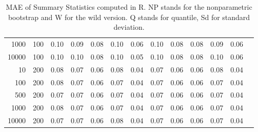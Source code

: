 \begin{table}[ht]
\begin{tabular}{rrrrrrrrrrrrr}
  1000 & 100 & 0.10 & 0.09 & 0.08 & 0.10 & 0.06 & 0.10 & 0.08 & 0.08 & 0.09 & 0.06 \\ 
  10000 & 100 & 0.10 & 0.10 & 0.08 & 0.10 & 0.05 & 0.10 & 0.08 & 0.08 & 0.10 & 0.06 \\ 
  10 & 200 & 0.08 & 0.07 & 0.06 & 0.08 & 0.04 & 0.07 & 0.06 & 0.06 & 0.08 & 0.04 \\ 
  100 & 200 & 0.08 & 0.07 & 0.06 & 0.07 & 0.04 & 0.07 & 0.06 & 0.06 & 0.07 & 0.04 \\ 
  500 & 200 & 0.07 & 0.07 & 0.06 & 0.07 & 0.04 & 0.07 & 0.06 & 0.06 & 0.07 & 0.04 \\ 
  1000 & 200 & 0.08 & 0.07 & 0.06 & 0.07 & 0.04 & 0.07 & 0.06 & 0.06 & 0.07 & 0.04 \\ 
  10000 & 200 & 0.07 & 0.07 & 0.06 & 0.08 & 0.04 & 0.07 & 0.06 & 0.06 & 0.07 & 0.04 \\  
   \hline
\end{tabular}
\caption[MAE of Summary Statistics R]{MAE of Summary Statistics computed in R. NP stands for the nonparametric bootstrap and W for the wild version. Q stands for quantile, Sd for standard deviation.}
\label{tab:sum_mae_r}
\end{table}

